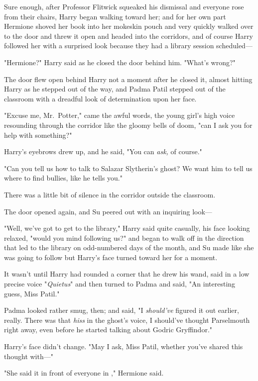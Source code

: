 Sure enough, after Professor Flitwick squeaked his dismissal and everyone rose 
from their chairs, Harry began walking toward her; and for her own part 
Hermione shoved her book into her mokeskin pouch and very quickly walked over 
to the door and threw it open and headed into the corridors, and of course 
Harry followed her with a surprised look because they had a library session 
scheduled---

"Hermione?" Harry said as he closed the door behind him. "What's wrong?"

The door flew open behind Harry not a moment after he closed it, almost hitting 
Harry as he stepped out of the way, and Padma Patil stepped out of the 
classroom with a dreadful look of determination upon her face.

"Excuse me, Mr.~Potter," came the awful words, the young girl's high voice 
resounding through the corridor like the gloomy bells of doom, "can I ask you 
for help with something?"

Harry's eyebrows drew up, and he said, "You can \emph{ask,} of course."

"Can you tell us how to talk to Salazar Slytherin's ghost? We want him to tell 
us where to find bullies, like he tells you."

There was a little bit of silence in the corridor outside the classroom.

The door opened again, and Su peered out with an inquiring look---

"Well, we've got to get to the library," Harry said quite casually, his face 
looking relaxed, "would you mind following us?" and began to walk off in the 
direction that led to the library on odd-numbered days of the month, and Su 
made like she was going to follow but Harry's face turned toward her for a 
moment.

It wasn't until Harry had rounded a corner that he drew his wand, said in a low 
precise voice "\emph{Quietus}" and then turned to Padma and said, "An 
interesting guess, Miss Patil."

Padma looked rather smug, then; and said, "I \emph{should've} figured it out 
earlier, really. There was that \emph{hiss} in the ghost's voice, I should've 
thought Parselmouth right away, even before he started talking about Godric 
Gryffindor."

Harry's face didn't change. "May I ask, Miss Patil, whether you've shared this 
thought with---"

"She said it in front of everyone in \SPHEW," Hermione said.

